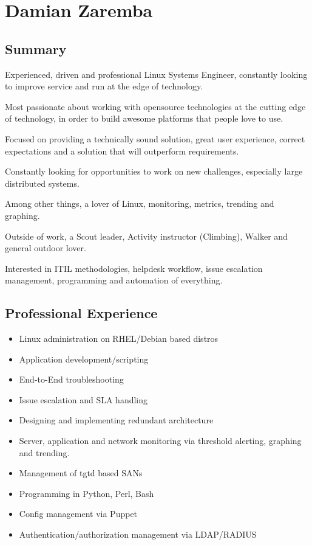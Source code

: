 \section{Damian Zaremba}

\subsection{Summary}

Experienced, driven and professional Linux Systems Engineer, constantly
looking to improve service and run at the edge of technology.

Most passionate about working with opensource technologies at the
cutting edge of technology, in order to build awesome platforms that
people love to use.

Focused on providing a technically sound solution, great user
experience, correct expectations and a solution that will outperform
requirements.

Constantly looking for opportunities to work on new challenges,
especially large distributed systems.

Among other things, a lover of Linux, monitoring, metrics, trending and
graphing.

Outside of work, a Scout leader, Activity instructor (Climbing), Walker
and general outdoor lover.

Interested in ITIL methodologies, helpdesk workflow, issue escalation
management, programming and automation of everything.

\subsection{Professional Experience}

\begin{itemize}
\item
  Linux administration on RHEL/Debian based distros
\item
  Application development/scripting
\item
  End-to-End troubleshooting
\item
  Issue escalation and SLA handling
\item
  Designing and implementing redundant architecture
\item
  Server, application and network monitoring via threshold alerting,
  graphing and trending.
\item
  Management of tgtd based SANs
\item
  Programming in Python, Perl, Bash
\item
  Config management via Puppet
\item
  Authentication/authorization management via LDAP/RADIUS
\end{itemize}
